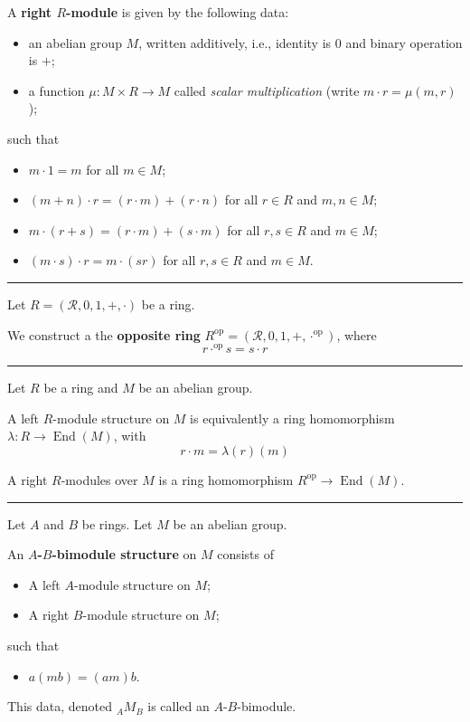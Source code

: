 \documentclass[12pt]{article}
\newcommand{\keyword}[1]{\textbf{#1}}
\newcommand{\sepline}{\rule{\textwidth}{0.4pt}}
\theoremstyle{definition}
\newcommand{\RR}{\mathcal{R}}
\newcommand{\<}{\left\langle}
\renewcommand{\>}{\right\rangle}
\newcommand{\op}{\mathrm{op}}
\DeclareMathOperator{\End}{End}
\renewcommand{\_}[1]{{_{#1}}}
\begin{document}
A \keyword{right $R$-module} is given by the following data:
\begin{itemize}
    \item an abelian group $M$, written additively, i.e., identity is $0$ and binary operation is $+$;
    \item a function $\mu : M \times R \to M$ called \emph{scalar multiplication} (write $m \cdot r = \mu(m, r)$);
\end{itemize}
such that
\begin{itemize}
    \item $m \cdot 1 = m$ for all $m \in M$;
    \item $(m + n) \cdot r = (r \cdot m) + (r \cdot n)$ for all $r \in R$ and $m, n \in M$;
    \item $m \cdot (r + s) = (r \cdot m) + (s \cdot m)$ for all $r, s \in R$ and $m \in M$;
    \item $(m \cdot s) \cdot r = m \cdot (sr)$ for all $r, s \in R$ and $m \in M$.
\end{itemize}

\sepline

Let $R = (\RR, 0, 1, +, \cdot)$ be a ring.

We construct a the \keyword{opposite ring} $R^\op = (\RR, 0, 1, +, \cdot^\op)$, where
\[
    r \cdot^\op s = s \cdot r
\]

\sepline

Let $R$ be a ring and $M$ be an abelian group.

A left $R$-module structure on $M$ is equivalently a ring homomorphism $\lambda : R \to \End(M)$, with
\[
    r \cdot m = \lambda(r)(m)
\]

A right $R$-modules over $M$ is a ring homomorphism $R^\op \to \End(M)$.




\sepline

Let $A$ and $B$ be rings.
Let $M$ be an abelian group.

An \keyword{$A$-$B$-bimodule structure} on $M$
consists of
\begin{itemize}
    \item A left $A$-module structure on $M$;
    \item A right $B$-module structure on $M$;
\end{itemize}
such that
\begin{itemize}
    \item $a(mb) = (am)b$.
\end{itemize}

This data, denoted $\_AM_B$ is called an $A$-$B$-bimodule.
\end{document}
